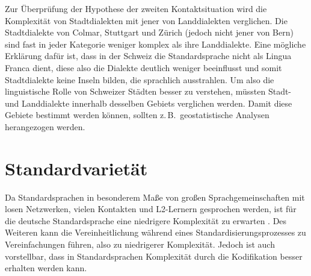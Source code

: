 Zur Überprüfung der Hypothese der zweiten Kontaktsituation wird die Komplexität von Stadtdialekten mit jener von Landdialekten verglichen. Die Stadtdialekte von Colmar, Stuttgart und Zürich (jedoch nicht jener von Bern) sind fast in jeder Kategorie weniger komplex als ihre Landdialekte. Eine mögliche Erklärung dafür ist, dass in der Schweiz die Standardsprache nicht als Lingua Franca dient, diese also die Dialekte deutlich weniger beeinflusst und somit Stadtdialekte keine Inseln bilden, die sprachlich ausstrahlen. Um also die linguistische Rolle von Schweizer Städten besser zu verstehen, müssten Stadt- und Landdialekte innerhalb desselben Gebiets verglichen werden. Damit diese Gebiete bestimmt werden können, sollten z.\,B.\ geostatistische Analysen herangezogen werden.\\

\section{Standardvarietät} Da Standardsprachen in besonderem Maße von großen Sprachgemeinschaften mit losen Netzwerken, vielen Kontakten und L2-Ler\-nern gesprochen werden, ist für die deutsche Standardsprache eine niedrigere Komplexität zu erwarten \citep{Trudgill2011}. Des Weiteren kann die Vereinheitlichung während eines Standardisierungsprozesses zu Vereinfachungen führen, also zu niedrigerer Komplexität. Jedoch ist auch vorstellbar, dass in Standardsprachen Komplexität durch die Kodifikation besser erhalten werden kann.

